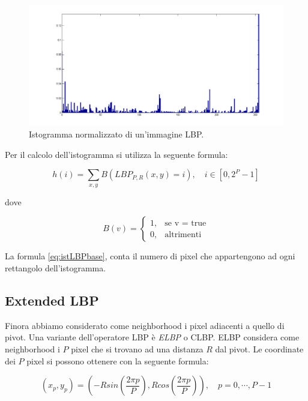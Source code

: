 \begin{figure}[ht]
\begin{center}
\includegraphics[width=1\textwidth]{img/hist-complete}
\caption{ Istogramma normalizzato di un'immagine LBP. }
\label{fig:istCompleteLBP}
\end{center}
\end{figure}

Per il calcolo dell'istogramma si utilizza la seguente formula:

\begin{equation}
\label{eq:istLBPbase}
h(i) = \sum_{x,y} B(LBP_{P,R}(x, y) = i) , \quad i \in  [0, 2^P-1 ]
\end{equation}

dove

\begin{equation}
B(v) = 	\begin{cases} 1, & \mbox{se v = true} \\ 0, & \mbox{altrimenti} \end{cases}
\end{equation}
\vspace{0.1cm}

La formula \ref{eq:istLBPbase}, conta il numero di pixel che appartengono ad ogni rettangolo dell'istogramma.

\subsection{Extended LBP}
\label{MLBP:extended}
Finora abbiamo considerato come neighborhood i pixel adiacenti a quello di pivot. Una variante dell'operatore \acs{LBP} è \textit{\acf{ELBP}} o \acf{CLBP}. \acs{ELBP} considera come neighborhood i $P$ pixel che si trovano ad una distanza $R$ dal pivot. Le coordinate dei $P$ pixel si possono ottenere con la seguente formula:

\begin{equation}
(x_p, y_p) = \left(  - Rsin\left( \frac{2\pi p}{P} \right), Rcos\left( \frac{2\pi p}{P} \right) \right)   , \quad p = 0, \cdots, P-1
\end{equation}

